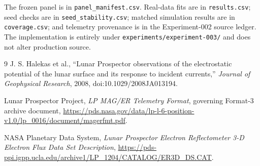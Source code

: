 \documentclass[11pt]{article}
\newcommand{\code}[1]{\texttt{#1}}
\begin{document}
The frozen panel is in \code{panel\_manifest.csv}.  Real-data fits are in
\code{results.csv}; seed checks are in \code{seed\_stability.csv}; matched
simulation results are in \code{coverage.csv}; and telemetry provenance is in
the Experiment-002 source ledger.  The implementation is entirely under
\code{experiments/experiment-003/} and does not alter production source.

\begin{thebibliography}{9}
J. S. Halekas et al., ``Lunar Prospector observations of the electrostatic
potential of the lunar surface and its response to incident currents,''
\emph{Journal of Geophysical Research}, 2008,
doi:10.1029/2008JA013194.

Lunar Prospector Project, \emph{LP MAG/ER Telemetry Format}, governing Format-3
archive document,
\url{https://pds.nasa.gov/data/lp-l-6-position-v1.0/lp_0016/document/magerfmt.pdf}.

NASA Planetary Data System, \emph{Lunar Prospector Electron Reflectometer
3-D Electron Flux Data Set Description},
\url{https://pds-ppi.igpp.ucla.edu/archive1/LP_1204/CATALOG/ER3D_DS.CAT}.
\end{thebibliography}
\end{document}
